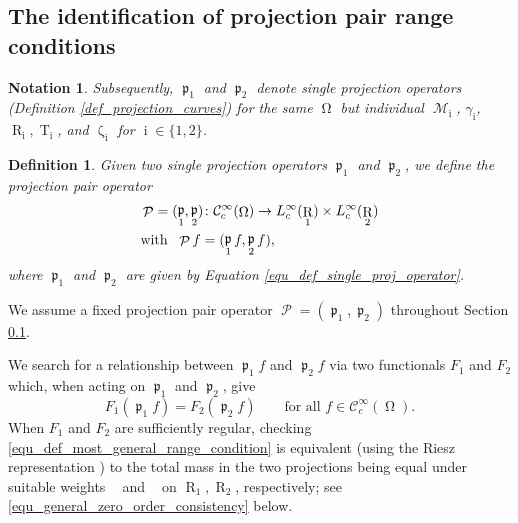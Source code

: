 \documentclass[12pt]{article}
\newtheorem{definition}[theorem]{Definition}
\newtheorem{notation}[theorem]{Notation}
\DeclareMathOperator{\projvariable}{i}
\DeclareMathOperator{\Proj}{\mathcal{P}}
\DeclareMathOperator{\Projind}{\mathfrak{p}}
\DeclareMathOperator{\tgroundset}{T}
\DeclareMathOperator{\raygroundset}{R}
\DeclareMathOperator{\Vone}{V_1}
\DeclareMathOperator{\Vtwo}{V_2}
\newcommand{\conditionname}{$\mathrm{PPRC}$}
\DeclareMathOperator{\weightfkt}{\zeta}
\DeclareMathOperator{\imgdom}{{\Omega}}
\DeclareMathOperator{\gammagroundset}{{\mathcal M}}
\begin{document}

\subsection{The identification of projection pair range conditions}
\label{section_projection_pair_identification_kernels}

\begin{notation}
Subsequently, $\Projind_1$ and $\Projind_2$ denote single projection operators (Definition \ref{def_projection_curves}) for the same $\imgdom$ but individual $\gammagroundset_{\projvariable}$, $\gamma_{\projvariable}$, $\raygroundset_{\projvariable}, \tgroundset_{\projvariable}$, and $\weightfkt_{\projvariable}$ for $\projvariable \in \{1,2\}$.
\end{notation}

\begin{definition}
Given two single projection operators $\Projind_1$ and $\Projind_2$, we define the projection pair operator 
\begin{align}
&\Proj=(\Projind_1,\Projind_2)\colon \mathcal{C}^\infty_c(\imgdom) \to L^\infty_c(\raygroundset_1)\times L^\infty_c(\raygroundset_2)
\\
&\text{with }\ \Proj f =(\Projind_1 f,\Projind_2 f), \notag
\end{align}
where $\Projind_1$ and $\Projind_2$ are given by Equation \eqref{equ_def_single_proj_operator}.
 
\end{definition}
We assume a fixed projection pair operator $\Proj=(\Projind_1,\Projind_2)$ throughout Section \ref{section_projection_pair_identification_kernels}.

We search for a relationship between $\Projind_1 f$ and $\Projind_2 f$ 
via two functionals $F_1$ and $F_2$ which, when acting on $\Projind_1$ and $\Projind_2$, give 
\begin{equation}\label{equ_def_most_general_range_condition}
F_1(\Projind_1 f) = F_2(\Projind_2 f) \qquad \text{for all }f\in \mathcal{C}^\infty_c(\imgdom). 
\end{equation} 
When $F_1$ and $F_2$ are sufficiently regular, checking \eqref{equ_def_most_general_range_condition} is equivalent (using the Riesz representation \cite[ch.6 section 4, part 8]{royden2010real}) to the total mass in the two projections being equal under suitable weights $\Vone$ and $\Vtwo$ on $\raygroundset_1,\raygroundset_2$, respectively; see \eqref{equ_general_zero_order_consistency} below.
\end{document}
